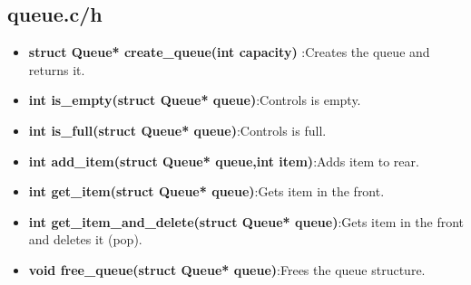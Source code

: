 \documentclass{article}
\begin{document}
\subsection{queue.c/h}
\begin{itemize}
    \item \textbf{struct Queue* create\_queue(int capacity) }:Creates the queue and returns it.
    \item \textbf{int is\_empty(struct Queue* queue)}:Controls is empty.
    \item \textbf{int is\_full(struct Queue* queue)}:Controls is full.
    \item \textbf{int add\_item(struct Queue* queue,int item)}:Adds item to rear.
    \item \textbf{int get\_item(struct Queue* queue)}:Gets item in the front.
    \item \textbf{int get\_item\_and\_delete(struct Queue* queue)}:Gets item in the front and deletes it (pop).
    \item \textbf{void free\_queue(struct Queue* queue)}:Frees the queue structure.
    
\end{itemize}

\newpage
\end{document}
